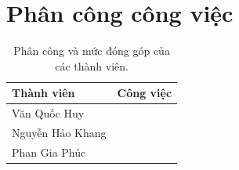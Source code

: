 \section{Phân công công việc}
\label{sec:contributions}

\begin{table}[H]
\centering
\caption{Phân công và mức đóng góp của các thành viên.}
\begin{tabularx}{\linewidth}{lX}
\toprule
\textbf{Thành viên} & \textbf{Công việc} \\
\midrule
Văn Quốc Huy & \\
Nguyễn Hảo Khang & \\
Phan Gia Phúc & \\
\bottomrule
\end{tabularx}
\end{table}
